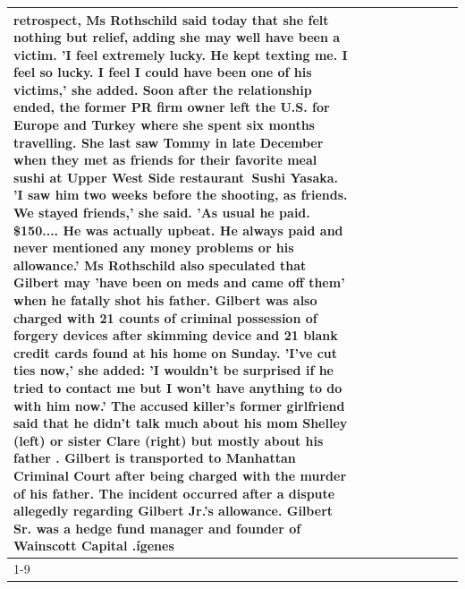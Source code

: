 \begin{table}[H]
\begin{tabular}{lllrlllll}
retrospect, Ms Rothschild said today that she felt nothing but relief, adding she may well have been a victim. 'I feel extremely lucky. He kept texting me. I feel so lucky. I feel I could have been one of his victims,' she added. Soon after the relationship ended, the former PR firm owner left the U.S. for Europe and Turkey where she spent six months  travelling. She last saw Tommy in late December when they met as friends for their favorite meal sushi at Upper West Side restaurant Sushi Yasaka. 'I saw him two weeks before the shooting, as friends. We stayed friends,' she said. 'As usual he paid. \$150.... He was actually upbeat. He always paid and never mentioned any money problems or his allowance.' Ms Rothschild also speculated that Gilbert may 'have been on meds and came off them' when he fatally shot his father. Gilbert was also charged with 21 counts of criminal possession of forgery devices after skimming device and 21 blank credit cards found at his home on Sunday. 'I've cut ties now,' she added: 'I wouldn’t be surprised if he tried to contact me but I won’t have anything to do with him now.' The accused killer's former girlfriend said that he didn't talk much about his mom Shelley (left) or sister Clare (right) but mostly about his father . Gilbert is transported to Manhattan Criminal Court  after being charged with the murder of his father. The incident occurred after a dispute allegedly regarding Gilbert Jr.'s allowance. Gilbert Sr. was a hedge fund manager and founder of Wainscott Capital .ígenes \\
\cline{1-9}

\end{tabular}
\end{table}
